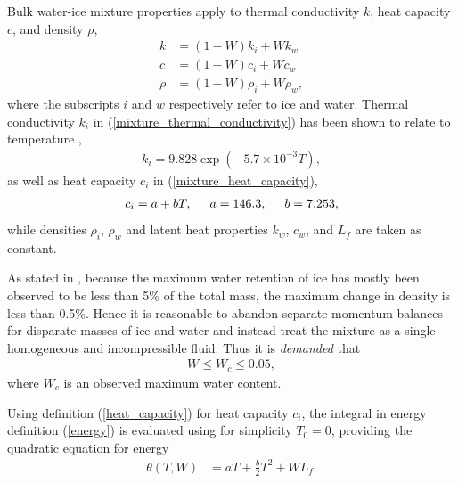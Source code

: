 Bulk water-ice mixture properties apply to thermal conductivity $k$, heat capacity $c$, and density $\rho$,
\begin{align}
  \label{mixture_thermal_conductivity}
  k &= (1-W) k_i + W k_w \\
  \label{mixture_heat_capacity}
  c &= (1-W) c_i + W c_w \\
  \label{mixture_density}
  \rho &= (1-W) \rho_i + W \rho_w,
\end{align}
where the subscripts $i$ and $w$ respectively refer to ice and water.  Thermal conductivity  $k_i$ in (\ref{mixture_thermal_conductivity}) has been shown to relate to temperature \citep{yen_1981, ritz_1987, greve_2009},
\begin{align}
  \label{thermal_conductivity}
  k_i = 9.828 \exp\left( -5.7 \times 10^{-3} T \right),
\end{align}
as well as heat capacity $c_i$ in (\ref{mixture_heat_capacity}),
\begin{align}
  \label{heat_capacity}
  c_i = a + b T, \hspace{5mm} a = 146.3, \hspace{5mm} b = 7.253,
\end{align}
while densities $\rho_i$, $\rho_w$ and latent heat properties $k_w$, $c_w$, and $L_f$ are taken as constant.
  
As stated in \citet{hutter_1982, greve_1997, greve_2009, aschwanden_2012}, because the maximum water retention of ice has mostly been observed to be less than 5\% of the total mass, the maximum change in density is less than 0.5\%.  Hence it is reasonable to abandon separate momentum balances for disparate masses of ice and water and instead treat the mixture as a single homogeneous and incompressible fluid.  Thus it is \emph{demanded} that
\begin{align}
  \label{water_demand}
  W \leq W_c \leq 0.05,
\end{align}
where $W_c$ is an observed maximum water content.

Using definition (\ref{heat_capacity}) for heat capacity $c_i$, the integral in energy definition (\ref{energy}) is evaluated using for simplicity $T_0=0$, providing the quadratic equation for energy
\begin{align}
  \label{energy_quad}
  \theta(T,W) &= a T + \frac{b}{2} T^2 + W L_f.
\end{align}

